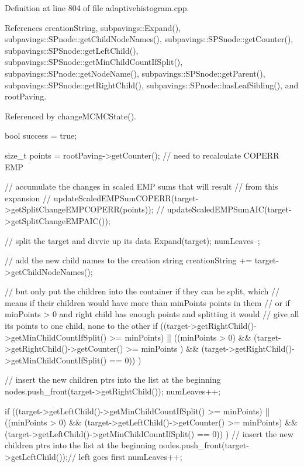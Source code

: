 \-Definition at line 804 of file adaptivehistogram.\-cpp.



\-References creation\-String, subpavings\-::\-Expand(), subpavings\-::\-S\-Pnode\-::get\-Child\-Node\-Names(), subpavings\-::\-S\-P\-Snode\-::get\-Counter(), subpavings\-::\-S\-P\-Snode\-::get\-Left\-Child(), subpavings\-::\-S\-P\-Snode\-::get\-Min\-Child\-Count\-If\-Split(), subpavings\-::\-S\-Pnode\-::get\-Node\-Name(), subpavings\-::\-S\-P\-Snode\-::get\-Parent(), subpavings\-::\-S\-P\-Snode\-::get\-Right\-Child(), subpavings\-::\-S\-Pnode\-::has\-Leaf\-Sibling(), and root\-Paving.



\-Referenced by change\-M\-C\-M\-C\-State().


\begin{DoxyCode}
{
    bool success = true;

    size_t points = rootPaving->getCounter(); // need to recalculate COPERR EMP

    // accumulate the changes in scaled EMP sums that will result
    // from this expansion
   // updateScaledEMPSumCOPERR(target->getSplitChangeEMPCOPERR(points));
   // updateScaledEMPSumAIC(target->getSplitChangeEMPAIC());

    // split the target and divvie up its data
    Expand(target);
    numLeaves--;

    // add the new child names to the creation string
    creationString += target->getChildNodeNames();

    // but only put the children into the container if they can be split, which
    // means if their children would have more than minPoints points in them
    // or if minPoints > 0 and right child has enough points and splitting it
       would
    // give all its points to one child, none to the other
    if ((target->getRightChild()->getMinChildCountIfSplit() >= minPoints)
        ||
        ((minPoints > 0) && (target->getRightChild()->getCounter() >= minPoints
      )
        && (target->getRightChild()->getMinChildCountIfSplit() == 0))
        ) {

        // insert the new children ptrs into the list at the beginning
        nodes.push_front(target->getRightChild());
        numLeaves++;
    }

    if ((target->getLeftChild()->getMinChildCountIfSplit() >= minPoints)
        ||
        ((minPoints > 0) && (target->getLeftChild()->getCounter() >= minPoints)
        && (target->getLeftChild()->getMinChildCountIfSplit() == 0))
        ) {
        // insert the new children ptrs into the list at the beginning
        nodes.push_front(target->getLeftChild());// left goes first
        numLeaves++;
    }

}
\end{DoxyCode}
